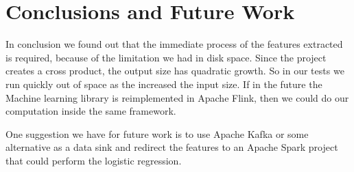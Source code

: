 \chapter{Conclusions and Future Work}
In conclusion we found out that the immediate process of the features extracted is required, because of the limitation we had in disk space. Since the project creates a cross product, the output size has quadratic growth. So in our tests we run quickly out of space as the increased the input size. If in the future the Machine learning library is reimplemented in Apache Flink, then we could do our computation inside the same framework. 

One suggestion we have for future work is to use Apache Kafka or some alternative as a data sink and redirect the features to an Apache Spark project that could perform the logistic regression. 